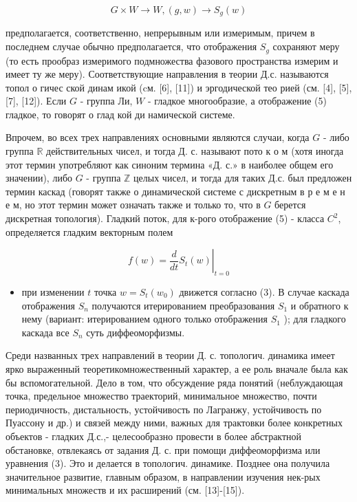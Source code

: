 \documentclass[10pt]{article}
\begin{document}
\[

G \times W \rightarrow W,(g, w) \rightarrow S_{g}(w)

\]



предполагается, соответственно, непрерывным или измеримым, причем в последнем случае обычно предполагается, что отображения $S_{g}$ сохраняют меру (то есть прообраз измеримого подмножества фазового пространства измерим и имеет ту же меру). Соответствующие направления в теории Д.с. называются топол о гичес ской динам икой (cм. [6], [11]) и эргодической тео рией (см. [4], [5], [7], [12]). Если $G$ - группа Ли, $W$ - гладкое многообразие, а отображение (5) гладкое, то говорят о глад кой ди намической системе.



Впрочем, во всех трех направлениях основными являются случаи, когда $G$ - либо группа $\mathbb{R}$ действительных чисел, и тогда Д. с. называют пото к о м (хотя иногда этот термин употребляют как синоним термина «Д. с.» в наиболее общем его значении), либо $G$ - группа $\mathbb{Z}$ целых чисел, и тогда для таких Д.с. был предложен термин каскад (говорят также о динамической системе с дискретным в р е м е н е м, но этот термин может означать также и только то, что в $G$ берется дискретная топология). Гладкий поток, для к-рого отображение (5) - класса $C^{2}$, определяется гладким векторным полем



\[

f(w)=\left.\frac{d}{d t} S_{t}(w)\right|_{t=0}

\]



\begin{itemize}

  \item при изменении $t$ точка $w=S_{t}\left(w_{0}\right)$ движется согласно (3). В случае каскада отображения $S_{n}$ получаются итерированием преобразования $S_{1}$ и обратного к нему (вариант: итерированием одного только отображения $S_{1}$ ); для гладкого каскада все $S_{n}$ суть диффеоморфизмы.

\end{itemize}



Среди названных трех направлений в теории Д. с. топологич. динамика имеет ярко выраженный теоретикомножественный характер, а ее роль вначале была как бы вспомогательной. Дело в том, что обсуждение ряда понятий (неблуждающая точка, предельное множество траекторий, минимальное множество, почти периодичность, дистальность, устойчивость по Лагранжу, устойчивость по Пуассону и др.) и связей между ними, важных для трактовки более конкретных объектов - гладких Д.с.,- целесообразно провести в более абстрактной обстановке, отвлекаясь от задания Д. с. при помощи диффеоморфизма или уравнения (3). Это и делается в топологич. динамике. Позднее она получила значительное развитие, главным образом, в направлении изучения нек-рых минимальных множеств и их расширений (см. [13]-[15]).
\end{document}
